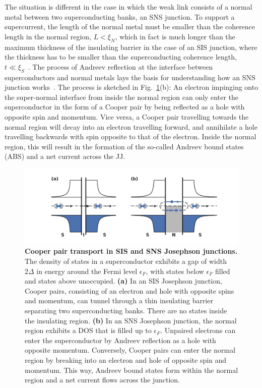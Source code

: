 The situation is different in the case in which the weak link consists of a normal metal between two superconducting banks, an SNS junction.
%
To support a supercurrent, the length of the normal metal must be smaller than the coherence length in the normal region, $L<\xi_N$, which in fact is much longer than the maximum thickness of the insulating barrier in the case of an SIS junction, where the thickness has to be smaller than the superconducting coherence length, $t\ll\xi_S$~\cite{caladoBallisticJosephsonJunctions2015d,benshalomQuantumOscillationsCritical2015}.
%
The process of Andreev reflection at the interface between superconductors and normal metals lays the basis for understanding how an SNS junction works~\cite{blonderTransitionMetallicTunneling1982c}.
%
The process is sketched in Fig.~\ref{fig:modelsnsdos}(b):
%
An electron impinging onto the super-normal interface from inside the normal region can only enter the superconductor in the form of a Cooper pair by being reflected as a hole with opposite spin and momentum.
%
Vice versa, a Cooper pair travelling towards the normal region will decay into an electron travelling forward, and annihilate a hole travelling backwards with spin opposite to that of the electron.
%
Inside the normal region, this will result in the formation of the so-called Andreev bound states (ABS) and a net current across the JJ.

\begin{figure}[t]
	\centering
	\includegraphics[width=\linewidth]{chapter-introduction/figs/model_SNS_DOS}
	\caption{
		\textbf{Cooper pair transport in SIS and SNS Josephson junctions.}
		The density of states in a superconductor exhibits a gap of width $2\Delta$ in energy around the Fermi level $\epsilon_F$, with states below $\epsilon_F$ filled and states above unoccupied.
		\textbf{(a)} In an SIS Josephson junction, Cooper pairs, consisting of an electron and hole with opposite spins and momentum, can tunnel through a thin insulating barrier separating two superconducting banks.
		There are no states inside the insulating region.
		\textbf{(b)} In an SNS Josephson junction, the normal region exhibits a DOS that is filled up to $\epsilon_F$.
		Unpaired electrons can enter the superconductor by Andreev reflection as a hole with opposite momentum.
		Conversely, Cooper pairs can enter the normal region by breaking into an electron and hole of opposite spin and momentum.
		This way, Andreev bound states form within the normal region and a net current flows across the junction.
	}
	\label{fig:modelsnsdos}
\end{figure}


